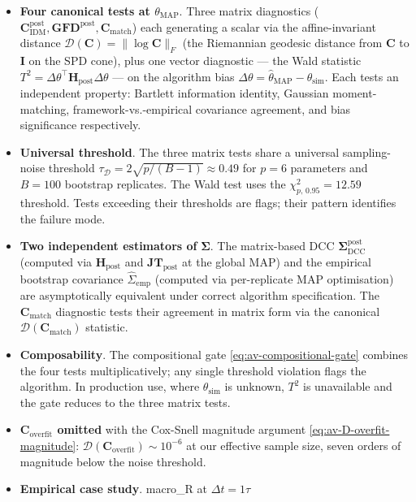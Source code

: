 \documentclass[11pt]{article}
\begin{document}
\begin{itemize}
\item \textbf{Four canonical tests at $\theta_{\mathrm{MAP}}$}. Three
  matrix diagnostics
  ($\mathbf C_{\mathrm{IDM}}^{\mathrm{post}}, \mathbf{GFD}^{\mathrm{post}},
  \mathbf C_{\mathrm{match}}$) each generating a scalar via the
  affine-invariant distance $\mathcal D(\mathbf C) = \|\log\mathbf C\|_F$
  (the Riemannian geodesic distance from $\mathbf C$ to $\mathbf I$ on
  the SPD cone), plus one vector diagnostic --- the Wald statistic
  $T^2 = \Delta\theta^\top\mathbf H_{\mathrm{post}}\Delta\theta$
  --- on the algorithm bias $\Delta\theta = \widehat\theta_{\mathrm{MAP}} - \theta_{\mathrm{sim}}$.
  Each tests an independent property: Bartlett information identity,
  Gaussian moment-matching, framework-vs.-empirical covariance
  agreement, and bias significance respectively.
\item \textbf{Universal threshold}. The three matrix tests share a
  universal sampling-noise threshold $\tau_{\mathcal D} = 2\sqrt{p/(B-1)}
  \approx 0.49$ for $p = 6$ parameters and $B = 100$ bootstrap
  replicates. The Wald test uses the $\chi^2_{p,\,0.95} = 12.59$
  threshold. Tests exceeding their thresholds are flags; their pattern
  identifies the failure mode.
\item \textbf{Two independent estimators of} $\boldsymbol\Sigma$. The
  matrix-based DCC $\boldsymbol\Sigma_{\mathrm{DCC}}^{\mathrm{post}}$
  (computed via $\mathbf H_{\mathrm{post}}$ and $\mathbf{JT}_{\mathrm{post}}$
  at the global MAP) and the empirical bootstrap covariance
  $\widehat\Sigma_{\mathrm{emp}}$ (computed via per-replicate MAP
  optimisation) are asymptotically equivalent under correct algorithm
  specification. The $\mathbf C_{\mathrm{match}}$ diagnostic tests
  their agreement in matrix form via the canonical
  $\mathcal D(\mathbf C_{\mathrm{match}})$ statistic.
\item \textbf{Composability}. The compositional gate
  \eqref{eq:av-compositional-gate} combines the four tests
  multiplicatively; any single threshold violation flags the algorithm.
  In production use, where $\theta_{\mathrm{sim}}$ is unknown, $T^2$
  is unavailable and the gate reduces to the three matrix tests.
\item \textbf{$\mathbf C_{\mathrm{overfit}}$ omitted} with the
  Cox-Snell magnitude argument \eqref{eq:av-D-overfit-magnitude}:
  $\mathcal D(\mathbf C_{\mathrm{overfit}}) \sim 10^{-6}$ at our
  effective sample size, seven orders of magnitude below the noise
  threshold.
\item \textbf{Empirical case study}. macro\_R at $\Delta t = 1\tau$

\end{itemize}
\end{document}
